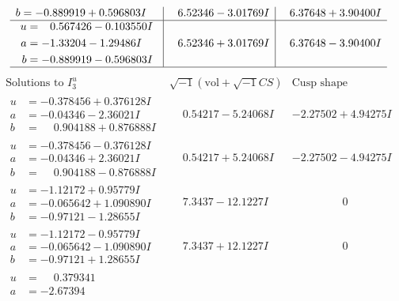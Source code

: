 \documentclass[1p]{elsarticle_modified}
\theoremstyle{definition}
\newcommand{\I}{\sqrt{-1}}
\begin{document}
$$\begin{array}{c|c|c}
\begin{aligned}
b &= -0.889919 + 0.596803 I\end{aligned}
 & \phantom{-}6.52346 - 3.01769 I & \phantom{-}6.37648 + 3.90400 I \\ \hline\begin{aligned}
u &= \phantom{-}0.567426 - 0.103550 I \\
a &= -1.33204 - 1.29486 I \\
b &= -0.889919 - 0.596803 I\end{aligned}
 & \phantom{-}6.52346 + 3.01769 I & \phantom{-}6.37648 - 3.90400 I\\
 \hline 
 \end{array}$$\newpage$$\begin{array}{c|c|c}  
\text{Solutions to }I^u_{3}& \I (\text{vol} + \sqrt{-1}CS) & \text{Cusp shape}\\
 \hline 
\begin{aligned}
u &= -0.378456 + 0.376128 I \\
a &= -0.04346 - 2.36021 I \\
b &= \phantom{-}0.904188 + 0.876888 I\end{aligned}
 & \phantom{-}0.54217 - 5.24068 I & -2.27502 + 4.94275 I \\ \hline\begin{aligned}
u &= -0.378456 - 0.376128 I \\
a &= -0.04346 + 2.36021 I \\
b &= \phantom{-}0.904188 - 0.876888 I\end{aligned}
 & \phantom{-}0.54217 + 5.24068 I & -2.27502 - 4.94275 I \\ \hline\begin{aligned}
u &= -1.12172 + 0.95779 I \\
a &= -0.065642 + 1.090890 I \\
b &= -0.97121 - 1.28655 I\end{aligned}
 & \phantom{-}7.3437 - 12.1227 I & \phantom{-0.000000 } 0 \\ \hline\begin{aligned}
u &= -1.12172 - 0.95779 I \\
a &= -0.065642 - 1.090890 I \\
b &= -0.97121 + 1.28655 I\end{aligned}
 & \phantom{-}7.3437 + 12.1227 I & \phantom{-0.000000 } 0 \\ \hline\begin{aligned}
u &= \phantom{-}0.379341\phantom{ +0.000000I} \\
a &= -2.67394\phantom{ +0.000000I} \\

\end{aligned}
\end{array}$$
\end{document}
